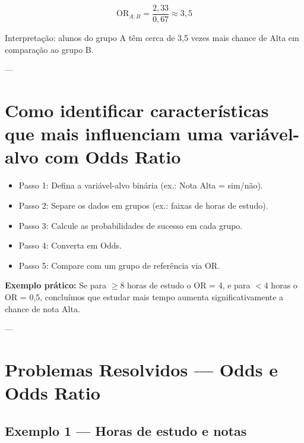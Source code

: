 \[
\mathrm{OR}_{A:B} = \frac{2,33}{0,67} \approx 3,5
\]

Interpretação: alunos do grupo A têm cerca de 3,5 vezes mais chance de Alta em comparação ao grupo B.

---

\section{Como identificar características que mais influenciam uma variável-alvo com Odds Ratio}
\begin{itemize}[leftmargin=*]
  \item Passo 1: Defina a variável-alvo binária (ex.: Nota Alta = sim/não).  
  \item Passo 2: Separe os dados em grupos (ex.: faixas de horas de estudo).  
  \item Passo 3: Calcule as probabilidades de sucesso em cada grupo.  
  \item Passo 4: Converta em Odds.  
  \item Passo 5: Compare com um grupo de referência via OR.  
\end{itemize}

\textbf{Exemplo prático:}  
Se para $\ge 8$ horas de estudo o OR = 4, e para $< 4$ horas o OR = 0,5, concluímos que estudar mais tempo aumenta significativamente a chance de nota Alta.

---
\clearpage
\section{Problemas Resolvidos — Odds e Odds Ratio}

\subsection*{Exemplo 1 — Horas de estudo e notas}


